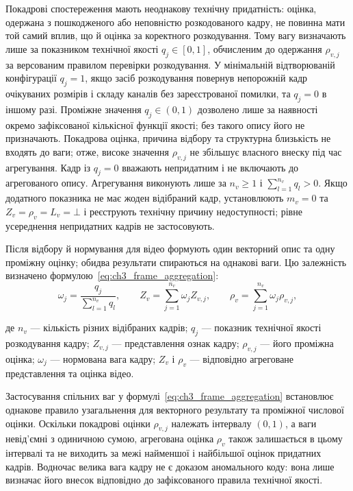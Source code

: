 Покадрові спостереження мають неоднакову технічну придатність: оцінка, одержана з пошкодженого або неповністю розкодованого кадру, не повинна мати той самий вплив, що й оцінка за коректного розкодування. Тому вагу визначають лише за показником технічної якості $q_j\in[0,1]$, обчисленим до одержання $\rho_{v,j}$ за версованим правилом перевірки розкодування. У мінімальній відтворюваній конфігурації $q_j=1$, якщо засіб розкодування повернув непорожній кадр очікуваних розмірів і складу каналів без зареєстрованої помилки, та $q_j=0$ в іншому разі. Проміжне значення $q_j\in(0,1)$ дозволено лише за наявності окремо зафіксованої кількісної функції якості; без такого опису його не призначають. Покадрова оцінка, причина відбору та структурна близькість не входять до ваги; отже, високе значення $\rho_{v,j}$ не збільшує власного внеску під час агрегування. Кадр із $q_j=0$ вважають непридатним і не включають до агрегованого опису. Агрегування виконують лише за $n_v\geq1$ і $\sum_{l=1}^{n_v}q_l>0$. Якщо додатного показника не має жоден відібраний кадр, установлюють $m_v=0$ та $Z_v=\rho_v=L_v=\bot$ і реєструють технічну причину недоступності; рівне усереднення непридатних кадрів не застосовують.

Після відбору й нормування для відео формують один векторний опис та одну проміжну оцінку; обидва результати спираються на однакові ваги. Цю залежність визначено формулою~\eqref{eq:ch3_frame_aggregation}:
\begin{equation}
\omega_j=\frac{q_j}{\sum_{l=1}^{n_v}q_l},\qquad
Z_v=\sum_{j=1}^{n_v}\omega_jZ_{v,j},\qquad
\rho_v=\sum_{j=1}^{n_v}\omega_j\rho_{v,j},
\label{eq:ch3_frame_aggregation}
\end{equation}

де $n_v$ --- кількість різних відібраних кадрів; $q_j$ --- показник технічної якості розкодування кадру; $Z_{v,j}$ --- представлення ознак кадру; $\rho_{v,j}$ --- його проміжна оцінка; $\omega_j$ --- нормована вага кадру; $Z_v$ і $\rho_v$ --- відповідно агреговане представлення та оцінка відео.

Застосування спільних ваг у формулі~\eqref{eq:ch3_frame_aggregation} встановлює однакове правило узагальнення для векторного результату та проміжної числової оцінки. Оскільки покадрові оцінки $\rho_{v,j}$ належать інтервалу $(0,1)$, а ваги невід’ємні з одиничною сумою, агрегована оцінка $\rho_v$ також залишається в цьому інтервалі та не виходить за межі найменшої і найбільшої оцінок придатних кадрів. Водночас велика вага кадру не є доказом аномального коду: вона лише визначає його внесок відповідно до зафіксованого правила технічної якості.

